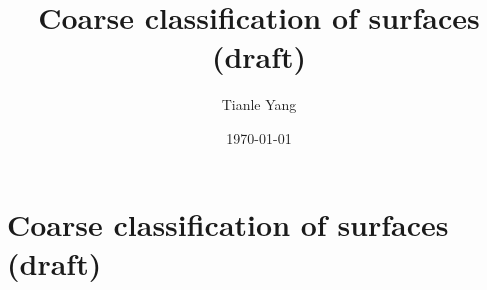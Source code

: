 \documentclass{noteformyself}
\title{Coarse classification of surfaces (draft)}
\author{Tianle Yang}
\date{\today}
\begin{document}
    \maketitle

    \section{Coarse classification of surfaces (draft)}


\end{document}
